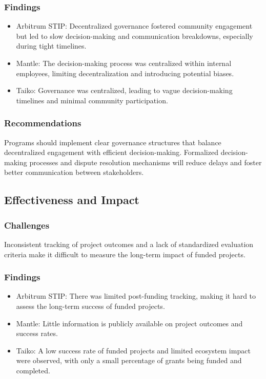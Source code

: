 \documentclass[a4,10pt]{article}
\begin{document}
\subsubsection{Findings}\label{sec_9.3.2}
\begin{itemize}
    \item Arbitrum STIP: Decentralized governance fostered community engagement but led to slow decision-making and communication breakdowns, especially during tight timelines.
    \item Mantle: The decision-making process was centralized within internal employees, limiting decentralization and introducing potential biases.
    \item Taiko: Governance was centralized, leading to vague decision-making timelines and minimal community participation.
\end{itemize}

\subsubsection{Recommendations}\label{sec_9.3.3}
Programs should implement clear governance structures that balance decentralized engagement with efficient decision-making. Formalized decision-making processes and dispute resolution mechanisms will reduce delays and foster better communication between stakeholders.

\subsection{Effectiveness and Impact}\label{sec_9.4}

\subsubsection{Challenges}\label{sec_9.4.1}
Inconsistent tracking of project outcomes and a lack of standardized evaluation criteria make it difficult to measure the long-term impact of funded projects.

\subsubsection{Findings}\label{sec_9.4.2}
\begin{itemize}
    \item Arbitrum STIP: There was limited post-funding tracking, making it hard to assess the long-term success of funded projects.
    \item Mantle: Little information is publicly available on project outcomes and success rates.
    \item Taiko: A low success rate of funded projects and limited ecosystem impact were observed, with only a small percentage of grants being funded and completed.
\end{itemize}
\end{document}
